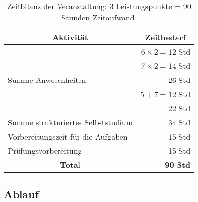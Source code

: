 \documentclass[a4paper]{article}%
\begin{document}
\begin{table}[h]\label{arbeitsaufwand}
\begin{center}
\begin{tabular}[]{@{}|l|r|}
\hline
  \multicolumn{1}{|c}{\hspace*{2cm}\textbf{Aktivität}\hspace*{2cm}}         & 
  \multicolumn{1}{c|}{\textbf{Zeitbedarf}} 
 \rule{0pt}{4ex} \\[4pt]\hline
\rule{0pt}{3ex}%
\hspace*{1cm}{\em Präsenzvorlesung}                  & $6\times 2 = 12$ Std   \\
\hspace*{1cm}{\em Übung}                             & $7\times 2 = 14$ Std   \\
\multicolumn{1}{|l|}{Summe Anwesenheiten}                    & $26$ Std               \\
\hspace*{1cm}{\em Digitalvorlesung}                  &  $5 + 7 = 12$ Std\footnotemark               \\
\hspace*{1cm}{\em Reader}                            &  $22$ Std              \\
\multicolumn{1}{|l|}{Summe strukturiertes Selbststudium}   & $34$ Std   \\
\multicolumn{1}{|l|}{Vorbereitungszeit für die Aufgaben}             & $15$ Std   \\
\multicolumn{1}{|l|}{Prüfungsvorbereitung}   & 15 Std                             \\[4pt]\hline
\multicolumn{1}{|c|}{\textbf{Total}}                 &  \textbf{90 Std} \rule{0pt}{4ex}    \\[4pt]\hline
\end{tabular}
\end{center}
\caption[Zeitbilanz der Veranstaltung]{Zeitbilanz der Veranstaltung: 3 Leistungspunkte = 90 Stunden Zeitaufwand.}

\end{table}




\clearpage




\subsection{Ablauf}
\end{document}
